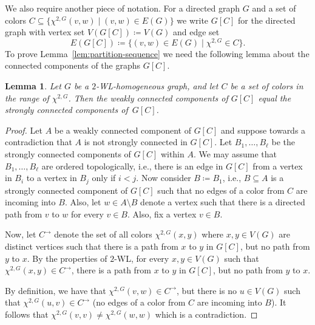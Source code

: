 \PassOptionsToPackage{dvipsnames,svgnames}{xcolor}\documentclass[10pt,a4paper]{article}
\newtheorem{lemma}{Lemma}[section]
\newcommand{\WL}[2]{\chi^{#1,#2}}
\begin{document}
We also require another piece of notation.
For a directed graph $G$ and a set of colors $C \subseteq \{\WL{2}{G}(v,w) \mid (v,w) \in E(G)\}$ we write $G[C]$ for the directed graph with vertex set $V(G[C]) \coloneqq V(G)$ and edge set
\[E(G[C]) \coloneqq \{(v,w) \in E(G) \mid \WL{2}{G} \in C\}.\]
To prove Lemma~\ref{lem:partition-sequence} we need the following lemma about the connected components of the graphs $G[C]$.

\begin{lemma}
 \label{lem:weakly-to-strongly-cc}
 Let $G$ be a $2$-WL-homogeneous graph, and let $C$ be a set of colors in the range of $\WL{2}{G}$.
 Then the weakly connected components of $G[C]$ equal the strongly connected components of~$G[C]$.
\end{lemma}

\begin{proof}
 Let $A$ be a weakly connected component of $G[C]$ and suppose towards a contradiction that $A$ is not strongly connected in $G[C]$.
 Let $B_1,\dots,B_\ell$ be the strongly connected components of $G[C]$ within $A$.
 We may assume that $B_1,\dots,B_\ell$ are ordered topologically, i.e., there is an edge in $G[C]$ from a vertex in $B_i$ to a vertex in $B_j$ only if $i < j$.
 Now consider $B \coloneqq B_1$, i.e., $B \subseteq A$ is a strongly connected component of $G[C]$ such that no edges of a color from $C$ are incoming into $B$.
 Also, let $w \in A \setminus B$ denote a vertex such that there is a directed path from $v$ to $w$ for every $v \in B$.
 Also, fix a vertex $v \in B$.

 Now, let $C^{\rightarrow}$ denote the set of all colors $\WL{2}{G}(x,y)$ where $x,y \in V(G)$ are distinct vertices such that there is a path from $x$ to $y$ in $G[C]$, but no path from $y$ to $x$.
 By the properties of $2$-WL, for every $x,y \in V(G)$ such that $\WL{2}{G}(x,y) \in C^{\rightarrow}$, there is a path from $x$ to $y$ in $G[C]$, but no path from $y$ to $x$.

 By definition, we have that $\WL{2}{G}(v,w) \in C^{\rightarrow}$, but there is no $u \in V(G)$ such that $\WL{2}{G}(u,v) \in C^{\rightarrow}$ (no edges of a color from $C$ are incoming into $B$).
 It follows that $\WL{2}{G}(v,v) \neq \WL{2}{G}(w,w)$ which is a contradiction.
\end{proof}
\end{document}
